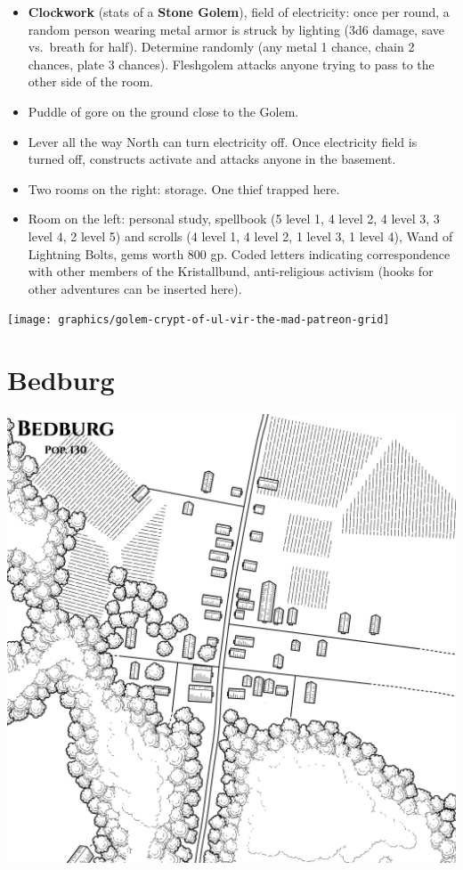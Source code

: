 \documentclass[
]{book}
\begin{document}
\begin{itemize}
\item
  \textbf{Clockwork} (stats of a \textbf{Stone Golem}), field of electricity: once per round, a random person wearing metal armor is struck by lighting (3d6 damage, save vs.~breath for half). Determine randomly (any metal 1 chance, chain 2 chances, plate 3 chances). Fleshgolem attacks anyone trying to pass to the other side of the room.
\item
  Puddle of gore on the ground close to the Golem.
\item
  Lever all the way North can turn electricity off. Once electricity field is turned off, constructs activate and attacks anyone in the basement.
\item
  Two rooms on the right: storage. One thief trapped here.
\item
  Room on the left: personal study, spellbook (5 level 1, 4 level 2, 4 level 3, 3 level 4, 2 level 5) and scrolls (4 level 1, 4 level 2, 1 level 3, 1 level 4), Wand of Lightning Bolts, gems worth 800 gp. Coded letters indicating correspondence with other members of the Kristallbund, anti-religious activism (hooks for other adventures can be inserted here).
\end{itemize}

\begin{center}\texttt{[image: graphics/golem-crypt-of-ul-vir-the-mad-patreon-grid]} \end{center}

\chapter{Bedburg}\label{bedburg}

\begin{center}\includegraphics[width=1\linewidth]{graphics/bedburg} \end{center}
\end{document}
